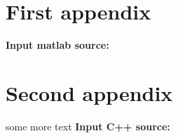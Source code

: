   
   

  \begin{appendices}
    \section{First appendix}
    \textbf{\textcolor[rgb]{0.98,0.00,0.00}{Input matlab source:}}
    \section{Second appendix}

    some more text \textcolor[rgb]{0.98,0.00,0.00}{\textbf{Input C++ source:}}
  \end{appendices}
